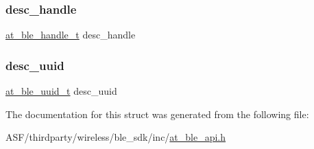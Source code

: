\subsubsection{\texorpdfstring{desc\_handle}{desc\_handle}}
{\footnotesize\ttfamily \mbox{\hyperlink{at__ble__api_8h_abd23646d0c662860741f787efc8456f2}{at\+\_\+ble\+\_\+handle\+\_\+t}} desc\+\_\+handle}

\mbox{\label{structat__ble__descriptor__found__t_a6b978f9d193b259230121ad4c455799a}} 
\subsubsection{\texorpdfstring{desc\_uuid}{desc\_uuid}}
{\footnotesize\ttfamily \mbox{\hyperlink{structat__ble__uuid__t}{at\+\_\+ble\+\_\+uuid\+\_\+t}} desc\+\_\+uuid}



The documentation for this struct was generated from the following file\+:\begin{DoxyCompactItemize}
\item 
A\+S\+F/thirdparty/wireless/ble\+\_\+sdk/inc/\mbox{\hyperlink{at__ble__api_8h}{at\+\_\+ble\+\_\+api.\+h}}\end{DoxyCompactItemize}
